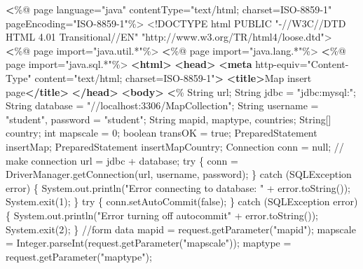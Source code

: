 \documentclass[
]{article}
\newenvironment{Shaded}{\begin{snugshade}}{\end{snugshade}}
\newcommand{\DataTypeTok}[1]{\textcolor[rgb]{0.13,0.29,0.53}{#1}}
\newcommand{\ErrorTok}[1]{\textcolor[rgb]{0.64,0.00,0.00}{\textbf{#1}}}
\newcommand{\KeywordTok}[1]{\textcolor[rgb]{0.13,0.29,0.53}{\textbf{#1}}}
\newcommand{\NormalTok}[1]{#1}
\newcommand{\OtherTok}[1]{\textcolor[rgb]{0.56,0.35,0.01}{#1}}
\newcommand{\StringTok}[1]{\textcolor[rgb]{0.31,0.60,0.02}{#1}}
\begin{document}
\begin{Shaded}
\begin{Highlighting}[]
\ErrorTok{\textless{}}\NormalTok{\%@ page language="java" contentType="text/html; charset=ISO{-}8859{-}1"}
\NormalTok{    pageEncoding="ISO{-}8859{-}1"\%\textgreater{}}
\DataTypeTok{\textless{}!DOCTYPE }\NormalTok{html PUBLIC "{-}//W3C//DTD HTML 4.01 Transitional//EN" "http://www.w3.org/TR/html4/loose.dtd"}\DataTypeTok{\textgreater{}}
\ErrorTok{\textless{}}\NormalTok{\%@ page import="java.util.*"\%\textgreater{}}
\ErrorTok{\textless{}}\NormalTok{\%@ page import="java.lang.*"\%\textgreater{}}
\ErrorTok{\textless{}}\NormalTok{\%@ page import="java.sql.*"\%\textgreater{}}
\KeywordTok{\textless{}html\textgreater{}}
\KeywordTok{\textless{}head\textgreater{}}
\KeywordTok{\textless{}meta}\OtherTok{ http{-}equiv=}\StringTok{"Content{-}Type"}\OtherTok{ content=}\StringTok{"text/html; charset=ISO{-}8859{-}1"}\KeywordTok{\textgreater{}}
\KeywordTok{\textless{}title\textgreater{}}\NormalTok{Map insert page}\KeywordTok{\textless{}/title\textgreater{}}
\KeywordTok{\textless{}/head\textgreater{}}
\KeywordTok{\textless{}body\textgreater{}}
    \ErrorTok{\textless{}}\NormalTok{\%}
\NormalTok{    String url;}
\NormalTok{    String jdbc = "jdbc:mysql:";}
\NormalTok{    String database = "//localhost:3306/MapCollection";}
\NormalTok{    String username = "student", password = "student";}
\NormalTok{    String mapid, maptype, countries;}
\NormalTok{    String[] country;}
\NormalTok{    int mapscale = 0;}
\NormalTok{    boolean transOK = true;}
\NormalTok{    PreparedStatement insertMap;}
\NormalTok{    PreparedStatement insertMapCountry;}
\NormalTok{    Connection conn = null; }
\NormalTok{    // make connection  }
\NormalTok{    url = jdbc + database;}
\NormalTok{    try \{}
\NormalTok{        conn = DriverManager.getConnection(url, username, password);}
\NormalTok{    \} catch (SQLException error) \{}
\NormalTok{        System.out.println("Error connecting to database: "}
\NormalTok{                    + error.toString());}
\NormalTok{        System.exit(1);}
\NormalTok{    \}}
\NormalTok{    try \{}
\NormalTok{        conn.setAutoCommit(false);}
\NormalTok{    \} catch (SQLException error) \{}
\NormalTok{        System.out.println("Error turning off autocommit"}
\NormalTok{                    + error.toString());}
\NormalTok{        System.exit(2);}
\NormalTok{    \}}
\NormalTok{    //form data}
\NormalTok{    mapid = request.getParameter("mapid");}
\NormalTok{    mapscale = Integer.parseInt(request.getParameter("mapscale"));}
\NormalTok{    maptype = request.getParameter("maptype");}

\end{Highlighting}
\end{Shaded}
\end{document}
